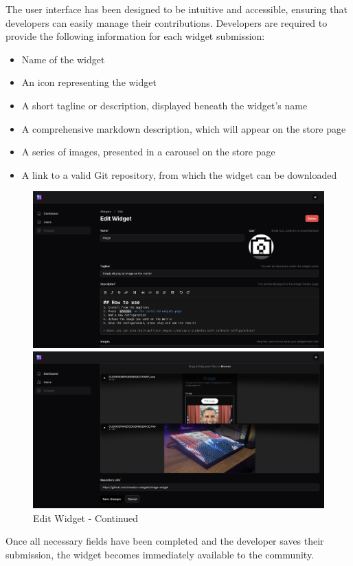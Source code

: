 The user interface has been designed to be intuitive and accessible, ensuring that developers can easily manage their contributions. Developers are required to provide the following information for each widget submission:

\begin{itemize} \item Name of the widget \item An icon representing the widget \item A short tagline or description, displayed beneath the widget’s name \item A comprehensive markdown description, which will appear on the store page \item A series of images, presented in a carousel on the store page \item A link to a valid Git repository, from which the widget can be downloaded \end{itemize}

\begin{figure}[h] \centering \begin{minipage}[b]{0.49\textwidth} \centering \includegraphics[width=\textwidth]{tesi/img/website_demo/widget-details.png} \caption*{Edit Widget} \end{minipage} \begin{minipage}[b]{0.49\textwidth} \centering \includegraphics[width=\textwidth]{tesi/img/website_demo/widget-details-2.png} \caption*{Edit Widget - Continued} \end{minipage} \end{figure}

Once all necessary fields have been completed and the developer saves their submission, the widget becomes immediately available to the community.